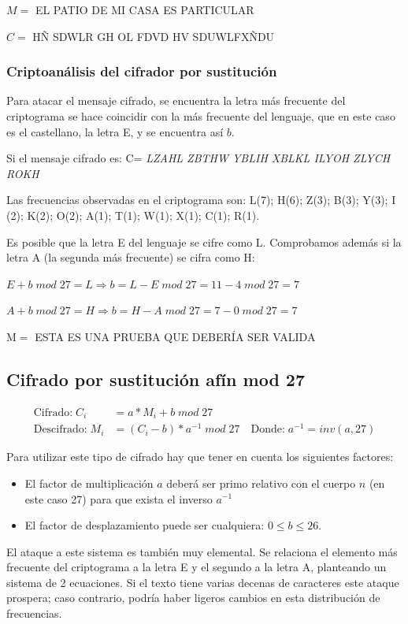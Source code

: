 \documentclass{article}
\begin{document}




$M=$ EL PATIO DE MI CASA ES PARTICULAR 

$C=$ H\~N SDWLR GH OL FDVD HV SDUWLFX\~NDU

\subsubsection{Criptoanálisis del cifrador por sustitución}
\justify

Para atacar el mensaje cifrado, se encuentra la letra más frecuente del criptograma se hace coincidir con la más frecuente del lenguaje, que en este caso es el castellano, la letra E, y se encuentra así $b$. 

Si el mensaje cifrado es:
C= \emph{LZAHL ZBTHW YBLIH XBLKL ILYOH ZLYCH ROKH} 

Las frecuencias observadas en el criptograma son: L(7); H(6); Z(3); B(3); Y(3); I (2); K(2); O(2); A(1); T(1); W(1); X(1); C(1); R(1). 

Es posible que la letra E del lenguaje se cifre como L. Comprobamos además si la letra A (la segunda más frecuente) se cifra como H:

$E+b \; mod \; 27=L\Rightarrow b=L-E \; mod \; 27 = 11-4\; mod \; 27= 7$

$A+b \; mod\;27=H \Rightarrow b=H-A \; mod \; 27=7-0\;mod\; 27=7 $

M$=$ ESTA ES UNA PRUEBA QUE DEBERÍA SER VALIDA

\subsection{Cifrado por sustitución afín mod 27}
\begin{equation*}
\begin{split}
    \text{Cifrado:}  \; C_{i}&=a*M_{i}+b\; mod \; 27 \\
    \text{Descifrado:}\; M_{i}&=\left ( C_{i}-b \right ) * a^{-1}\; mod \; 27 \quad \text{Donde:} \; a^{-1}=inv\left ( a,27 \right )
\end{split}
\end{equation*}

Para utilizar este tipo de cifrado hay que tener en cuenta los siguientes factores:
\begin{itemize}
    \item El factor de multiplicación $a$ deberá ser primo relativo con el cuerpo $n$ (en este caso 27) para que exista el inverso $a^{-1}$
    \item El factor de desplazamiento puede ser cualquiera: $0\leq b \leq 26$.
\end{itemize}
\justify
El ataque a este sistema es también muy elemental. Se relaciona el elemento más frecuente del criptograma a la letra E y el segundo a la letra A, planteando un sistema de 2 ecuaciones. Si el texto tiene varias decenas de caracteres este ataque prospera; caso contrario, podría haber ligeros cambios en esta distribución de frecuencias.
\end{document}
